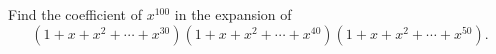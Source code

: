 Find the coefficient of $x^{100}$ in the expansion of
\[
\left(1+x+x^2+\cdots+x^{30}\right)\left(1+x+x^2+\cdots+x^{40}\right)\left(1+x+x^2+\cdots+x^{50}\right).
\]
